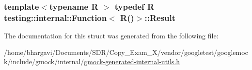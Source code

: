 \subsubsection[{\texorpdfstring{Result}{Result}}]{\setlength{\rightskip}{0pt plus 5cm}template$<$typename R $>$ typedef R {\bf testing\+::internal\+::\+Function}$<$ R()$>$\+::{\bf Result}}\hypertarget{structtesting_1_1internal_1_1_function_3_01_r_07_08_4_a5c228a886ef598ac10988f8de5e32ca1}{}\label{structtesting_1_1internal_1_1_function_3_01_r_07_08_4_a5c228a886ef598ac10988f8de5e32ca1}


The documentation for this struct was generated from the following file\+:\begin{DoxyCompactItemize}
\item 
/home/bhargavi/\+Documents/\+S\+D\+R/\+Copy\+\_\+\+Exam\+\_\+X/vendor/googletest/googlemock/include/gmock/internal/\hyperlink{gmock-generated-internal-utils_8h}{gmock-\/generated-\/internal-\/utils.\+h}\end{DoxyCompactItemize}
